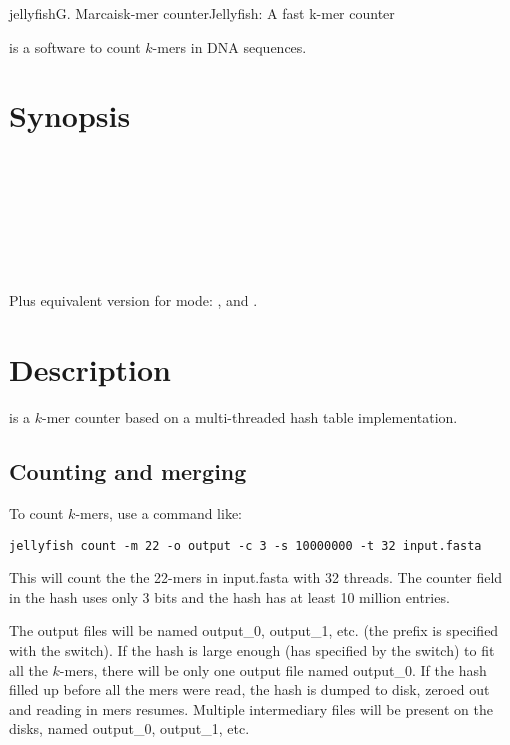 \documentclass[english]{article}
\newcommand{\ddash}[1]{-\,-#1}
\newcommand{\LoOpt}[1]{\oOpt{\ddash{#1}}}
\begin{document}
\begin{Name}{1}{jellyfish}{G. Marcais}{k-mer counter}{Jellyfish: A fast k-mer counter}

 is a software to count $k$-mers in DNA sequences.

\end{Name}

\section{Synopsis}
     \LoOpt{both-strands}   \\
   \Dots \\
   \\
  \\
     \\
  \\
 \\


Plus equivalent version for  mode: ,  and .

\section{Description}

 is a $k$-mer counter based on a multi-threaded hash
table implementation.

\subsection{Counting and merging}

To count $k$-mers, use a command like:

\begin{verbatim}
jellyfish count -m 22 -o output -c 3 -s 10000000 -t 32 input.fasta
\end{verbatim}

This will count the the 22-mers in input.fasta with 32 threads. The
counter field in the hash uses only 3 bits and the hash has at least
10 million entries.

The output files will be named output\_0, output\_1, etc. (the prefix
is specified with the  switch). If the hash is large enough
(has specified by the  switch) to fit all the $k$-mers, there
will be only one output file named output\_0. If the hash filled up
before all the mers were read, the hash is dumped to disk, zeroed out
and reading in mers resumes. Multiple intermediary files will be
present on the disks, named output\_0, output\_1, etc.
\end{document}
